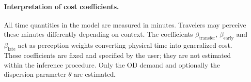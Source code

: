 \paragraph{Interpretation of cost coefficients.}
All time quantities in the model are measured in minutes. Travelers may perceive these minutes differently
depending on context. The coefficients $\beta_{\mathrm{transfer}}$, $\beta_{\mathrm{early}}$ and
$\beta_{\mathrm{late}}$ act as perception weights converting physical time into generalized cost.
These coefficients are fixed and specified by the user; they are not estimated within the inference procedure.
Only the OD demand and optionally the dispersion parameter $\theta$ are estimated.

